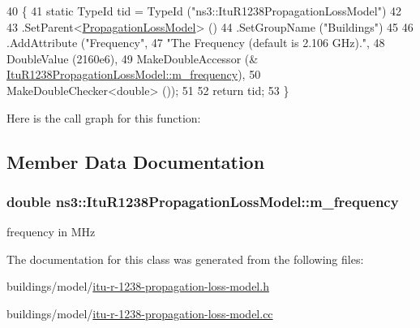 \begin{DoxyCode}
40 \{
41   \textcolor{keyword}{static} TypeId tid = TypeId (\textcolor{stringliteral}{"ns3::ItuR1238PropagationLossModel"})
42 
43     .SetParent<\hyperlink{classns3_1_1PropagationLossModel_ace8b78c2c8e805cd0a919d7e3543318c}{PropagationLossModel}> ()
44     .SetGroupName (\textcolor{stringliteral}{"Buildings"})
45 
46     .AddAttribute (\textcolor{stringliteral}{"Frequency"},
47                    \textcolor{stringliteral}{"The Frequency  (default is 2.106 GHz)."},
48                    DoubleValue (2160e6),
49                    MakeDoubleAccessor (&
      \hyperlink{classns3_1_1ItuR1238PropagationLossModel_af17c1679d11142d03fceed06a564161d}{ItuR1238PropagationLossModel::m\_frequency}),
50                    MakeDoubleChecker<double> ());
51 
52   \textcolor{keywordflow}{return} tid;
53 \}
\end{DoxyCode}


Here is the call graph for this function\+:




\subsection{Member Data Documentation}
\subsubsection[{\texorpdfstring{m\+\_\+frequency}{m_frequency}}]{\setlength{\rightskip}{0pt plus 5cm}double ns3\+::\+Itu\+R1238\+Propagation\+Loss\+Model\+::m\+\_\+frequency\hspace{0.3cm}{\ttfamily [private]}}\hypertarget{classns3_1_1ItuR1238PropagationLossModel_af17c1679d11142d03fceed06a564161d}{}\label{classns3_1_1ItuR1238PropagationLossModel_af17c1679d11142d03fceed06a564161d}


frequency in M\+Hz 



The documentation for this class was generated from the following files\+:\begin{DoxyCompactItemize}
\item 
buildings/model/\hyperlink{itu-r-1238-propagation-loss-model_8h}{itu-\/r-\/1238-\/propagation-\/loss-\/model.\+h}\item 
buildings/model/\hyperlink{itu-r-1238-propagation-loss-model_8cc}{itu-\/r-\/1238-\/propagation-\/loss-\/model.\+cc}\end{DoxyCompactItemize}
